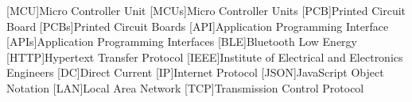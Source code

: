 % 
\begin{acronym}[STATCOM]    %
%
[MCU]{Micro Controller Unit}
[MCUs]{Micro Controller Units}
%
[PCB]{Printed Circuit Board}
[PCBs]{Printed Circuit Boards}
%
[API]{Application Programming Interface}
[APIs]{Application Programming Interfaces}
%
[BLE]{Bluetooth Low Energy}
%
[HTTP]{Hypertext Transfer Protocol}
%
[IEEE]{Institute of Electrical and Electronics Engineers}
%
[DC]{Direct Current}
%
[IP]{Internet Protocol}
%
[JSON]{JavaScript Object Notation}
%
[LAN]{Local Area Network}
%
[TCP]{Transmission Control Protocol}
%
\end{acronym}
%